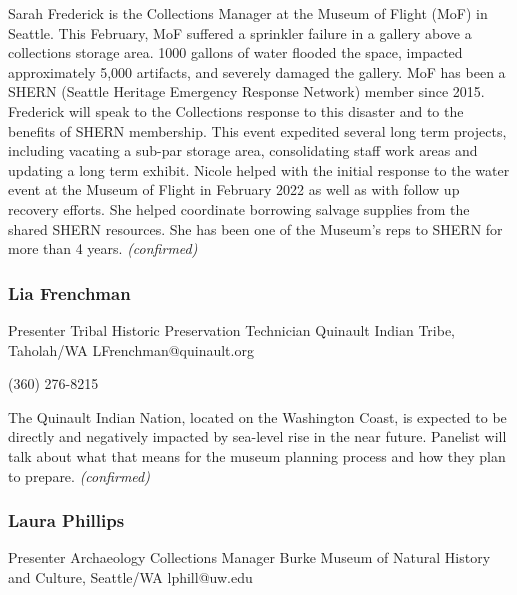 \documentclass{report}
\begin{document}
                Sarah Frederick is the Collections Manager at the Museum of Flight (MoF) in Seattle. This February, MoF suffered a sprinkler failure in a gallery above a collections storage area. 1000 gallons of water flooded the space, impacted approximately 5,000 artifacts, and severely damaged the gallery. MoF has been a SHERN (Seattle Heritage Emergency Response Network) member since 2015. Frederick will speak to the Collections response to this disaster and to the benefits of SHERN membership. This event expedited several long term projects, including vacating a sub-par storage area, consolidating staff work areas and updating a long term exhibit. 
Nicole helped with the initial response to the water event at the Museum of Flight in February 2022 as well as with follow up recovery efforts. She helped coordinate borrowing salvage supplies from the shared SHERN resources. She has been one of the Museum’s reps to SHERN for more than 4 years.
                \emph{ (confirmed) }
              

              
                \subsubsection*{ Lia Frenchman }
                Presenter\newline
                 Tribal Historic Preservation Technician\newline
                 Quinault Indian Tribe, Taholah/WA
                \newline
                LFrenchman@quinault.org\newline
                
                (360) 276-8215 \newline

                The Quinault Indian Nation, located on the Washington Coast, is expected to be directly and negatively impacted by sea-level rise in the near future. Panelist will talk about what that means for the museum planning process and how they plan to prepare.
                \emph{ (confirmed) }
              

              
                \subsubsection*{ Laura Phillips }
                Presenter\newline
                Archaeology Collections Manager\newline
                Burke Museum of Natural History and Culture, Seattle/WA
                \newline
                lphill@uw.edu\newline
                
\end{document}
